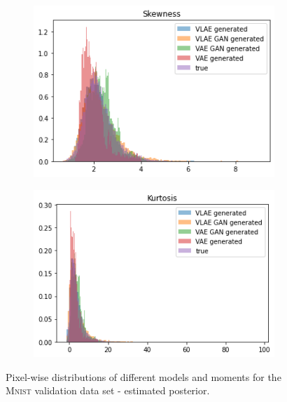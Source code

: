 \documentclass{beamer}
\begin{document}
\begin{frame}
\begin{figure}
\begin{subfigure}{0.48\textwidth}
\centering
\includegraphics[width=\textwidth]{images/generated_vs_true/mnist/mnist_vs_models_skew.png}
\end{subfigure}
\hfill
\begin{subfigure}{0.48\textwidth}
\centering
\includegraphics[width=\textwidth]{images/generated_vs_true/mnist/mnist_vs_models_kurt.png}
\end{subfigure}
\caption{Pixel-wise distributions of different models and moments for the \textsc{Mnist} validation data set - estimated posterior.}
\end{figure}
\end{frame}
\end{document}
